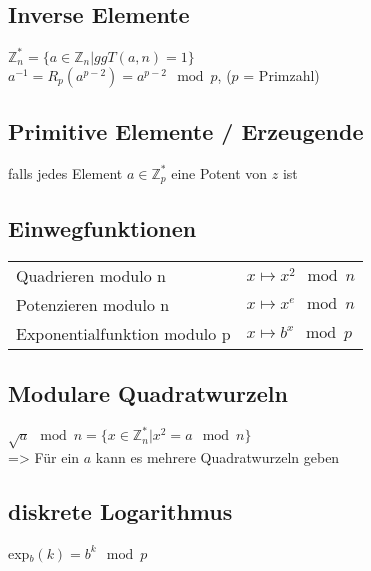 \subsection{Inverse Elemente}
$ \mathbb{Z}_n^* = \{ a \in \mathbb{Z}_n | ggT(a, n) = 1 \} $ \\
$ a^{-1} = R_p(a^{p-2}) = a^{p-2} \mod p $, ($p$ = Primzahl)

\subsection{Primitive Elemente / Erzeugende}
falls jedes Element $a \in \mathbb{Z}_p^* $ eine Potent von $z$ ist

\subsection{Einwegfunktionen}
\begin{tabular}{ll}
    Quadrieren modulo n & $ x \mapsto x^2 \mod n$ \\
    Potenzieren modulo n & $ x \mapsto x^e \mod n$ \\
    Exponentialfunktion modulo p & $ x \mapsto b^x \mod p$ \\
\end{tabular}

\subsection{Modulare Quadratwurzeln}
$ \sqrt{a} \mod n = \{ x \in \mathbb{Z}_n^* | x^2 = a \mod n \} $ \\
=> Für ein $a$ kann es mehrere Quadratwurzeln geben

\subsection{diskrete Logarithmus}
exp$_b(k) = b^k \mod p$
